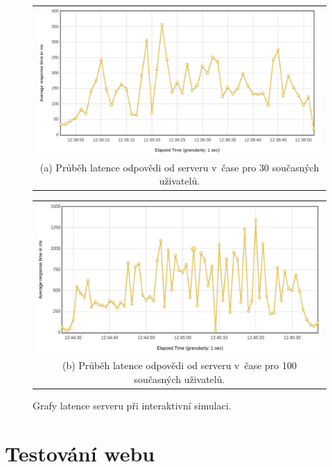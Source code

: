 \begin{figure}
  \centering
  \begin{tabular}{@{}c@{}}
    \includegraphics[width=\linewidth]{obrazky-figures/perf/local_metal_30_responseTimesOverTime.png} \\[\abovecaptionskip]
    \small (a) Průběh latence odpovědi od serveru v~čase pro 30 současných uživatelů.
  \end{tabular}

  \vspace{\floatsep}

  \begin{tabular}{@{}c@{}}
    \includegraphics[width=\linewidth]{obrazky-figures/perf/local_metal_100_responseTimesOverTime.png} \\[\abovecaptionskip]
    \small (b) Průběh latence odpovědi od serveru v~čase pro 100 současných uživatelů.
  \end{tabular}

  \caption{Grafy latence serveru při interaktivní simulaci.}
  \label{responseTimes}
\end{figure}

\section{Testování webu}

